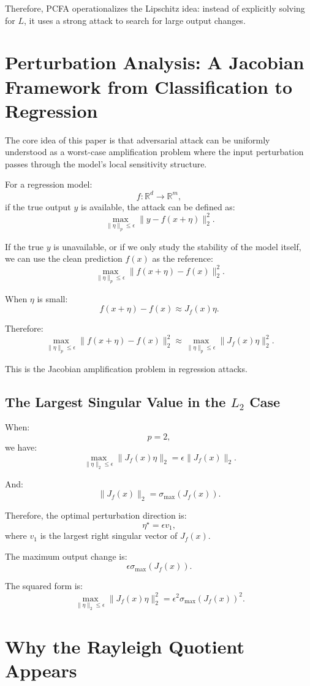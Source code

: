 \documentclass{article}
\begin{document}
Therefore, PCFA operationalizes the Lipschitz idea: instead of explicitly solving for \(L\), it uses a strong attack to search for large output changes.

\section{Perturbation Analysis: A Jacobian Framework from Classification to Regression}

The core idea of this paper is that adversarial attack can be uniformly understood as a worst-case amplification problem where the input perturbation passes through the model's local sensitivity structure.

For a regression model:
\[
f:\mathbb{R}^d\to \mathbb{R}^m,
\]
if the true output \(y\) is available, the attack can be defined as:
\[
\max_{\|\eta\|_p\leq \epsilon}
\|y-f(x+\eta)\|_2^2.
\]

If the true \(y\) is unavailable, or if we only study the stability of the model itself, we can use the clean prediction \(f(x)\) as the reference:
\[
\max_{\|\eta\|_p\leq \epsilon}
\|f(x+\eta)-f(x)\|_2^2.
\]

When \(\eta\) is small:
\[
f(x+\eta)-f(x)
\approx
J_f(x)\eta.
\]

Therefore:
\[
\max_{\|\eta\|_p\leq \epsilon}
\|f(x+\eta)-f(x)\|_2^2
\approx
\max_{\|\eta\|_p\leq \epsilon}
\|J_f(x)\eta\|_2^2.
\]

This is the Jacobian amplification problem in regression attacks.

\subsection{The Largest Singular Value in the \(L_2\) Case}

When:
\[
p=2,
\]
we have:
\[
\max_{\|\eta\|_2\leq \epsilon}
\|J_f(x)\eta\|_2
=
\epsilon
\|J_f(x)\|_2.
\]

And:
\[
\|J_f(x)\|_2
=
\sigma_{\max}(J_f(x)).
\]

Therefore, the optimal perturbation direction is:
\[
\eta^\star=\epsilon v_1,
\]
where \(v_1\) is the largest right singular vector of \(J_f(x)\).

The maximum output change is:
\[
\epsilon\sigma_{\max}(J_f(x)).
\]

The squared form is:
\[
\max_{\|\eta\|_2\leq \epsilon}
\|J_f(x)\eta\|_2^2
=
\epsilon^2\sigma_{\max}(J_f(x))^2.
\]

\section{Why the Rayleigh Quotient Appears}
\end{document}
